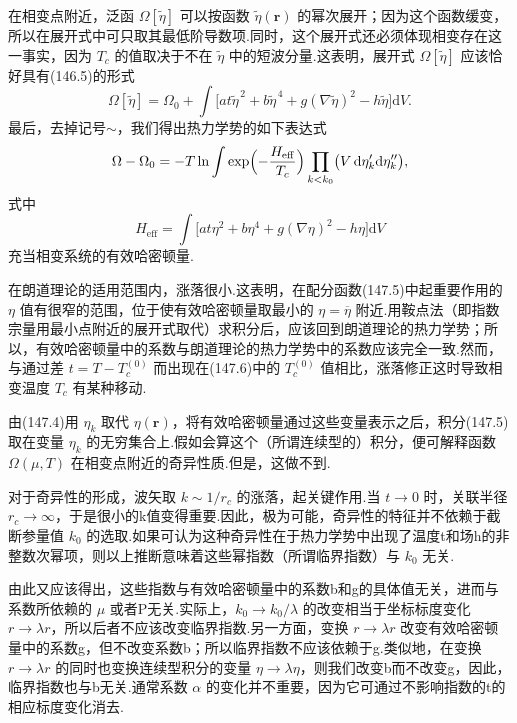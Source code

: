 在相变点附近，泛函 $\Omega[\widetilde{\eta}]$ 可以按函数 $\widetilde{\eta}(\boldsymbol{r})$ 的幂次展开；因为这个函数缓变，所以在展开式中可只取其最低阶导数项.同时，这个展开式还必须体现相变存在这一事实，因为 $T_c$ 的值取决于不在 $\widetilde{\eta}$ 中的短波分量.这表明，展开式 $\Omega[\widetilde{\eta}]$ 应该恰好具有(146.5)的形式
\begin{equation*}
  \Omega[\widetilde{\eta}]=\Omega_0
  +\int\bigl[at\widetilde{\eta}^{\,2}+b\widetilde{\eta}^{\,4}
  +g(\nabla\widetilde{\eta})^2-h\widetilde{\eta}\bigr]\mathrm{d}V.
\end{equation*}
最后，去掉记号$\sim$，我们得出热力学势的如下表达式
\begin{equation}
  \Omega-\Omega_0=-T\ln\int\exp\Bigl(-\frac{H_{\mathrm{eff}}}{T_c}\Bigr)
  \prod_{k<k_0}\bigl(V\,\mathrm{d}\eta_k'\mathrm{d}\eta_k''\bigr),
\end{equation}
式中
\begin{equation}
  H_{\mathrm{eff}}=\int\bigl[at\eta^2+b\eta^4
  +g(\nabla\eta)^2-h\eta\bigr]\mathrm{d}V
\end{equation}
充当相变系统的有效哈密顿量.

在朗道理论的适用范围内，涨落很小.这表明，在配分函数(147.5)中起重要作用的 $\eta$ 值有很窄的范围，位于使有效哈密顿量取最小的 $\eta=\overline{\eta}$ 附近.用鞍点法（即指数宗量用最小点附近的展开式取代）求积分后，应该回到朗道理论的热力学势；所以，有效哈密顿量中的系数与朗道理论的热力学势中的系数应该完全一致.然而，与通过差 $t=T-T_c^{(0)}$ 而出现在(147.6)中的 $T_c^{(0)}$ 值相比，涨落修正这时导致相变温度 $T_c$ 有某种移动.

由(147.4)用 $\eta_k$ 取代 $\eta(\boldsymbol{r})$，将有效哈密顿量通过这些变量表示之后，积分(147.5)取在变量 $\eta_k$ 的无穷集合上.假如会算这个（所谓连续型的）积分，便可解释函数 $\Omega(\mu,T)$ 在相变点附近的奇异性质.但是，这做不到.

对于奇异性的形成，波矢取 $k\sim1/r_c$ 的涨落，起关键作用.当 $t\to0$ 时，关联半径 $r_c\to\infty$，于是很小的k值变得重要.因此，极为可能，奇异性的特征并不依赖于截断参量值 $k_0$ 的选取.如果可认为这种奇异性在于热力学势中出现了温度t和场h的非整数次幂项，则以上推断意味着这些幂指数（所谓临界指数）与 $k_0$ 无关.

由此又应该得出，这些指数与有效哈密顿量中的系数b和g的具体值无关，进而与系数所依赖的 $\mu$ 或者P无关.实际上，$k_0\to k_0/\lambda$ 的改变相当于坐标标度变化 $r\to\lambda r$，所以后者不应该改变临界指数.另一方面，变换 $r\to\lambda r$ 改变有效哈密顿量中的系数g，但不改变系数b；所以临界指数不应该依赖于g.类似地，在变换 $r\to\lambda r$ 的同时也变换连续型积分的变量 $\eta\to\lambda\eta$，则我们改变b而不改变g，因此，临界指数也与b无关.通常系数 $\alpha$ 的变化并不重要，因为它可通过不影响指数的t的相应标度变化消去.

